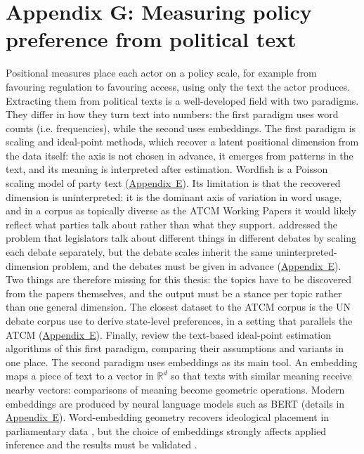 \section*{Appendix G: Measuring policy preference from political text}
\label{app:g}

Positional measures place each actor on a policy scale, for example from favouring regulation
to favouring access, using only the text the actor produces. Extracting them from political
texts is a well-developed field with two paradigms. They differ in how they turn text into
numbers: the first paradigm uses word counts (i.e. frequencies), while the second uses embeddings.
The first paradigm is scaling and ideal-point methods, which recover a latent positional dimension
from the data itself: the axis is not chosen in advance, it emerges from patterns in the text,
and its meaning is interpreted after estimation. Wordfish \parencite{Slapin2008} is a Poisson
scaling model of party text (\hyperref[app:e]{Appendix~E}). Its limitation is that the recovered dimension is
uninterpreted: it is the dominant axis of variation in word usage, and in a corpus as topically
diverse as the ATCM Working Papers it would likely reflect what parties talk about rather than
what they support. \textcite{Lauderdale2016} addressed the problem that
legislators talk about different things in different debates by scaling each debate separately,
but the debate scales inherit the same uninterpreted-dimension problem, and the debates must be
given in advance (\hyperref[app:e]{Appendix~E}). Two things are therefore missing for this thesis: the topics have
to be discovered from the papers themselves, and the output must be a stance per topic rather
than one general dimension.
The closest dataset to the ATCM corpus is the UN debate corpus \textcite{Baturo2017} use to
derive state-level preferences, in a setting that parallels the ATCM (\hyperref[app:e]{Appendix~E}). Finally,
\textcite{Parschan2025} review the text-based ideal-point estimation algorithms of this first
paradigm, comparing their assumptions and variants in one place.
The second paradigm uses embeddings as its main tool. An embedding maps a piece of text to a
vector in $\mathbb{R}^d$ so that texts with similar meaning receive nearby vectors: comparisons
of meaning become geometric operations. Modern embeddings are produced by neural language models
such as BERT \parencite{Devlin2019} (details in \hyperref[app:e]{Appendix~E}). Word-embedding geometry recovers
ideological placement in parliamentary data \parencite{Rheault2019}, but the choice of embeddings
strongly affects applied inference and the results must be validated \parencite{Rodriguez2021}.

